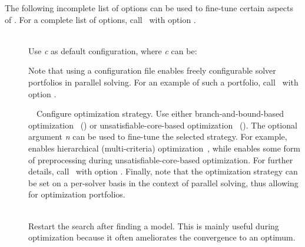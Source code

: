 The following incomplete list of options can be used to
fine-tune certain aspects of \clasp.
For a complete list of options,
call \clasp\ with option .
\begin{description}
  \item[]~\\
    Use \textit{c} as default configuration, where \textit{c} can be:
    Note that using a configuration file enables freely configurable
    solver portfolios in parallel solving. For an example of such a portfolio,
    call \clasp\ with option .
  \item[]~\
    Configure optimization strategy. Use either
    branch-and-bound-based optimization~\cite{gekakasc11c} () or
    unsatisfiable-core-based optimization~\cite{ankamasc12a} (\code{usc}).
    The optional argument \textit{n} can be used to fine-tune the selected strategy.
    For example, \code{bb,1} enables hierarchical (multi-criteria) optimization~\cite{gekakasc11c},
    while \code{usc,1} enables some form of preprocessing during unsatisfiable-core-based optimization.
    For further details, call \clasp\ with option \code{--help=2}.
    Finally, note that the optimization strategy can be set on a per-solver basis
    in the context of parallel solving, thus allowing for optimization portfolios.
  \item[\code{--restart-on-model}]~\\
    Restart the search after finding a model.
    This is mainly useful during optimization because
    it often ameliorates the convergence to an optimum.


\end{description}

